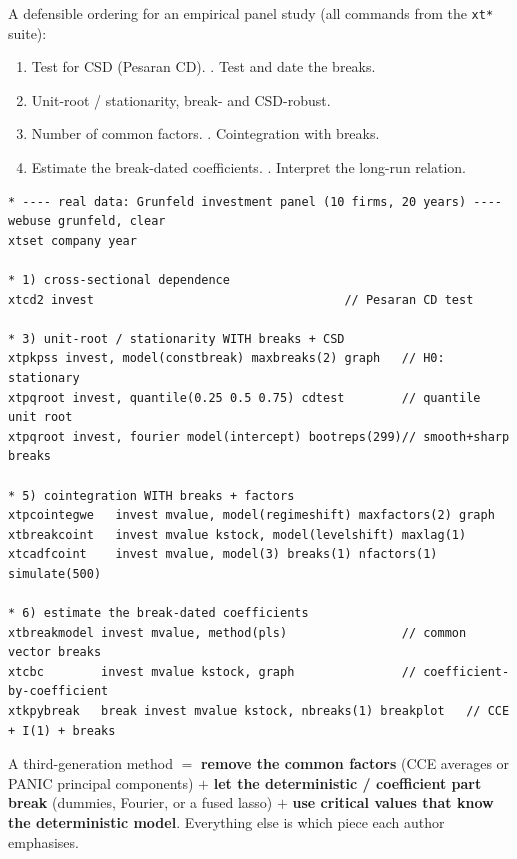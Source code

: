 \documentclass[11pt,a4paper]{article}
\newcommand{\cmd}[1]{\texttt{\textcolor{camber}{#1}}}
\newcommand{\hlt}[2]{\textcolor{#1}{\textbf{#2}}}
\theoremstyle{definition}
\begin{document}
A defensible ordering for an empirical panel study (all commands from the \cmd{xt*} suite):
\begin{enumerate}[leftmargin=1.5em,itemsep=1pt]
 \item Test for CSD (Pesaran CD). . Test and date the breaks.
 \item Unit-root / stationarity, break- and CSD-robust.
 \item Number of common factors. . Cointegration with breaks.
 \item Estimate the break-dated coefficients. . Interpret the long-run relation.
\end{enumerate}

\begin{lstlisting}
* ---- real data: Grunfeld investment panel (10 firms, 20 years) ----
webuse grunfeld, clear
xtset company year

* 1) cross-sectional dependence
xtcd2 invest                                   // Pesaran CD test

* 3) unit-root / stationarity WITH breaks + CSD
xtpkpss invest, model(constbreak) maxbreaks(2) graph   // H0: stationary
xtpqroot invest, quantile(0.25 0.5 0.75) cdtest        // quantile unit root
xtpqroot invest, fourier model(intercept) bootreps(299)// smooth+sharp breaks

* 5) cointegration WITH breaks + factors
xtpcointegwe   invest mvalue, model(regimeshift) maxfactors(2) graph
xtbreakcoint   invest mvalue kstock, model(levelshift) maxlag(1)
xtcadfcoint    invest mvalue, model(3) breaks(1) nfactors(1) simulate(500)

* 6) estimate the break-dated coefficients
xtbreakmodel invest mvalue, method(pls)                // common vector breaks
xtcbc        invest mvalue kstock, graph               // coefficient-by-coefficient
xtkpybreak   break invest mvalue kstock, nbreaks(1) breakplot   // CCE + I(1) + breaks
\end{lstlisting}

\begin{begbox}
A third-generation method $=$ \hlt{ccyan}{remove the common factors} (CCE averages or PANIC principal
components) $+$ \hlt{camber}{let the deterministic / coefficient part break} (dummies, Fourier, or a
fused lasso) $+$ \hlt{cblue}{use critical values that know the deterministic model}. Everything else
is which piece each author emphasises.
\end{begbox}

\end{document}
